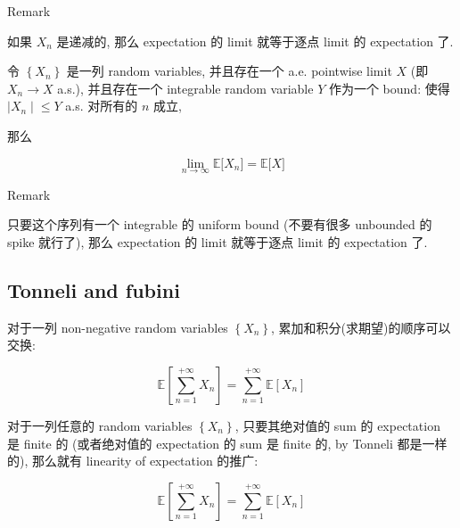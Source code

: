 \begin{qlremark}{Remark}

如果 \(\mathit{X}_{\mathit{n}}\) 是递减的, 那么 expectation 的 limit 就等于逐点 limit 的 expectation 了.

\end{qlremark}

\begin{theorem}{}

令 \(\left\{ \mathit{X}_{\mathit{n}} \right\}\) 是一列 random variables, 并且存在一个 a.e. pointwise limit \(\mathit{X}\) (即 \(\mathit{X}_{\mathit{n}}\rightarrow\mathit{X}\) a.s.), 并且存在一个 integrable random variable \(\mathit{Y}\) 作为一个 bound: 使得 \(\left. |\mathit{X}_{\mathit{n}} \middle| \leq \mathit{Y} \right.\) a.s. 对所有的 \(\mathit{n}\) 成立,

那么

\[\lim\limits_{\mathit{n}\rightarrow\infty}\mathbb{E}\lbrack\mathit{X}_{\mathit{n}}\rbrack = \mathbb{E}\lbrack\mathit{X}\rbrack\]

\end{theorem}

\begin{qlremark}{Remark}

只要这个序列有一个 integrable 的 uniform bound (不要有很多 unbounded 的 spike 就行了), 那么 expectation 的 limit 就等于逐点 limit 的 expectation 了.

\end{qlremark}

\subsection{Tonneli and fubini}\label{tonneli-and-fubini}

\begin{theorem}{}

对于一列 non-negative random variables \(\left\{ \mathit{X}_{\mathit{n}} \right\}\), 累加和积分(求期望)的顺序可以交换:

\[\mathbb{E}\left\lbrack {\sum\limits_{\mathit{n} = 1}^{+ \infty}\mathit{X}_{\mathit{n}}} \right\rbrack = \sum\limits_{\mathit{n} = 1}^{+ \infty}\mathbb{E}\left\lbrack \mathit{X}_{\mathit{n}} \right\rbrack\]

\end{theorem}

\begin{theorem}{}

对于一列任意的 random variables \(\left\{ \mathit{X}_{\mathit{n}} \right\}\), 只要其绝对值的 sum 的 expectation 是 finite 的 (或者绝对值的 expectation 的 sum 是 finite 的, by Tonneli 都是一样的), 那么就有 linearity of expectation 的推广:

\[\mathbb{E}\left\lbrack {\sum\limits_{\mathit{n} = 1}^{+ \infty}\mathit{X}_{\mathit{n}}} \right\rbrack = \sum\limits_{\mathit{n} = 1}^{+ \infty}\mathbb{E}\left\lbrack \mathit{X}_{\mathit{n}} \right\rbrack\]

\end{theorem}

